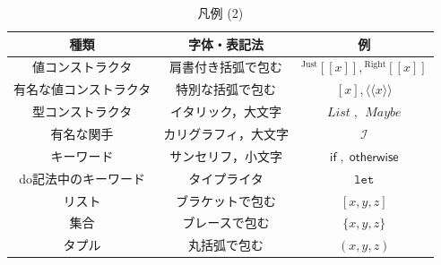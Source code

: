 \documentclass[a5paper,twoside,fleqn,draft]{jsbook}
\def\[{\left[\!\left[}
\def\]{\right]\!\right]}
\newcommand{\Langle}{\langle\!\langle}
\newcommand{\Rangle}{\rangle\!\rangle}
\newcommand{\mKeyword}[1]{\mathsf{#1}} %
\newcommand{\mVarKeyword}[1]{\texttt{#1}} %
\newcommand{\mDoLetKeyword}{\mVarKeyword{let}}
\newcommand{\mIfKeyword}{\mKeyword{if}}
\newcommand{\mOtherwiseKeyword}{\mKeyword{otherwise}}
\DeclareMathOperator{\mIf}{\mIfKeyword}
\DeclareMathOperator{\mOtherwise}{\mOtherwiseKeyword}
\newcommand{\mSpecialSub}[1]{\text{#1}}
\newcommand{\mRight}{\mSpecialSub{Right}}
\newcommand{\mTypeConstructor}[1]{\textit{#1}}
\DeclareMathOperator{\mListTypeConstructor}{\mTypeConstructor{List}}
\DeclareMathOperator{\mMaybeTypeConstructor}{\mTypeConstructor{Maybe}}
\newcommand{\mValueConstructor}[1]{\mathrm{#1}}
\newcommand{\mGenericValueAssemble}[2]{{}^\mValueConstructor{#1}\[#2\]}
\newcommand{\mRightWith}[1]{\mGenericValueAssemble{\mRight}{#1}}
\newcommand{\mJustWith}[1]{\mGenericValueAssemble{Just}{#1}}
\newcommand{\mFuncWith}[1]{\Langle#1\Rangle}
\newcommand{\mListWith}[1]{\left[#1\right]}
\newcommand{\mTupleUnboxedWith}[1]{\texttt{(\#}#1\texttt{\#)}}
\newcommand{\mFunctor}[1]{\textit{\textbf{#1}}}
\newcommand{\mSpecialFunctor}[1]{\mathcal{#1}} %
\DeclareMathOperator{\mIFunctor}{\mSpecialFunctor{I}}
\begin{document}
\begin{table}[p]
\caption{凡例 (2)}
\begin{center}
\begin{tabular}{||c|c|c||}
\hline
種類&字体・表記法&例\\
\hline\hline
値コンストラクタ&肩書付き括弧で包む&$\mJustWith{x},\mRightWith{x}$\\
有名な値コンストラクタ&特別な括弧で包む&$[x],\mFuncWith{x}$\\
\hline
型コンストラクタ&イタリック，大文字&$\mListTypeConstructor$, $\mMaybeTypeConstructor$\\
有名な関手&カリグラフィ，大文字&$\mIFunctor$\\
キーワード&サンセリフ，小文字&$\mIf,\mOtherwise$\\
do記法中のキーワード&タイプライタ&$\mDoLetKeyword$\\
\hline
リスト&ブラケットで包む&$\mListWith{x,y,z}$\\
集合&ブレースで包む&$\{x,y,z\}$\\
タプル&丸括弧で包む&$(x,y,z)$\\
\hline
\end{tabular}
\end{center}
\end{table}
\end{document}
